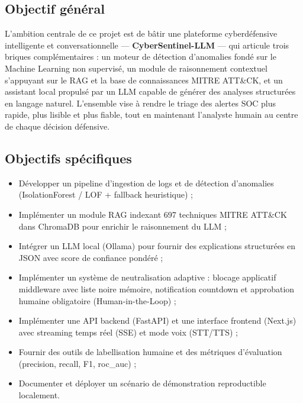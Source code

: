 \documentclass[12pt,a4paper]{report}
\begin{document}
\subsection*{Objectif général}
\begin{onehalfspace}
L'ambition centrale de ce projet est de bâtir une plateforme cyberdéfensive
intelligente et conversationnelle — \textbf{CyberSentinel-LLM} — qui articule
trois briques complémentaires : un moteur de détection d'anomalies fondé sur
le Machine Learning non supervisé, un module de raisonnement contextuel
s'appuyant sur le RAG et la base de connaissances MITRE ATT\&CK, et un
assistant local propulsé par un LLM capable de générer des analyses
structurées en langage naturel. L'ensemble vise à rendre le triage des
alertes SOC plus rapide, plus lisible et plus fiable, tout en maintenant
l'analyste humain au centre de chaque décision défensive.
\end{onehalfspace}

\subsection*{Objectifs spécifiques}
\begin{onehalfspace}
\begin{itemize}
  \item[\ding{43}] Développer un pipeline d'ingestion de logs et de détection
  d'anomalies (IsolationForest / LOF + fallback heuristique) ;
  \item[\ding{43}] Implémenter un module RAG indexant 697 techniques MITRE
  ATT\&CK dans ChromaDB pour enrichir le raisonnement du LLM ;
  \item[\ding{43}] Intégrer un LLM local (Ollama) pour fournir des explications
  structurées en JSON avec score de confiance pondéré ;
  \item[\ding{43}] Implémenter un système de neutralisation adaptive : blocage
  applicatif middleware avec liste noire mémoire, notification countdown et
  approbation humaine obligatoire (Human-in-the-Loop) ;
  \item[\ding{43}] Implémenter une API backend (FastAPI) et une interface
  frontend (Next.js) avec streaming temps réel (SSE) et mode voix (STT/TTS) ;
  \item[\ding{43}] Fournir des outils de labellisation humaine et des métriques
  d'évaluation (precision, recall, F1, roc\_auc) ;
  \item[\ding{43}] Documenter et déployer un scénario de démonstration
  reproductible localement.
\end{itemize}
\end{onehalfspace}
\end{document}
